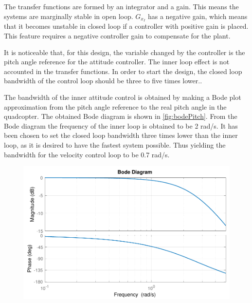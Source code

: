 The transfer functions are formed by an integrator and a gain. This means the systems are marginally stable in open loop. $G_{x_I}$ has a negative gain, which means that it becomes unstable in closed loop if a controller with positive gain is placed. This feature requires a negative controller gain to compensate for the plant.

It is noticeable that, for this design, the variable changed by the controller is the pitch angle reference for the attitude controller. The inner loop effect is not accounted in the transfer functions. In order to start the design, the closed loop bandwidth of the control loop should be three to five times lower.. 

The bandwidth of the inner attitude control is obtained by making a Bode plot approximation from the pitch angle reference to the real pitch angle in the quadcopter. The obtained Bode diagram is shown in \autoref{fig:bodePitch}. From the Bode diagram the frequency of the inner loop is obtained to be 2 rad/s. It has been chosen to set the closed loop bandwidth three times lower than the inner loop, as it is desired to have the fastest system possible. Thus yielding the bandwidth for the velocity control loop to be 0.7 rad/s.
%
\begin{figure}[H]
    \includegraphics[scale=.8]{figures/bodePitch}
    \centering			
    \label{fig:bodePitch}
\end{figure} 
%
